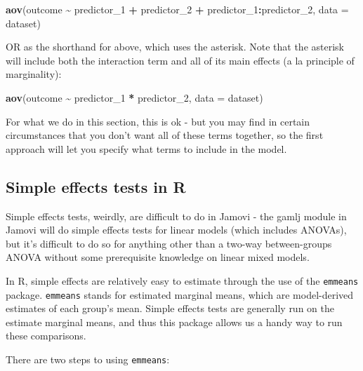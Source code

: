 \documentclass[
]{book}
\newenvironment{Shaded}{\begin{snugshade}}{\end{snugshade}}
\newcommand{\AttributeTok}[1]{\textcolor[rgb]{0.13,0.29,0.53}{#1}}
\newcommand{\FunctionTok}[1]{\textcolor[rgb]{0.13,0.29,0.53}{\textbf{#1}}}
\newcommand{\NormalTok}[1]{#1}
\newcommand{\SpecialCharTok}[1]{\textcolor[rgb]{0.81,0.36,0.00}{\textbf{#1}}}
\begin{document}
\begin{Shaded}
\begin{Highlighting}[]
\FunctionTok{aov}\NormalTok{(outcome }\SpecialCharTok{\textasciitilde{}}\NormalTok{ predictor\_1 }\SpecialCharTok{+}\NormalTok{ predictor\_2 }\SpecialCharTok{+}\NormalTok{ predictor\_1}\SpecialCharTok{:}\NormalTok{predictor\_2, }\AttributeTok{data =}\NormalTok{ dataset)}
\end{Highlighting}
\end{Shaded}

OR as the shorthand for above, which uses the asterisk. Note that the asterisk will include both the interaction term and all of its main effects (a la principle of marginality):

\begin{Shaded}
\begin{Highlighting}[]
\FunctionTok{aov}\NormalTok{(outcome }\SpecialCharTok{\textasciitilde{}}\NormalTok{ predictor\_1 }\SpecialCharTok{*}\NormalTok{ predictor\_2, }\AttributeTok{data =}\NormalTok{ dataset)}
\end{Highlighting}
\end{Shaded}

For what we do in this section, this is ok - but you may find in certain circumstances that you don't want all of these terms together, so the first approach will let you specify what terms to include in the model.

\hypertarget{simple-effects-tests-in-r}{%
\subsection{Simple effects tests in R}\label{simple-effects-tests-in-r}}

Simple effects tests, weirdly, are difficult to do in Jamovi - the gamlj module in Jamovi will do simple effects tests for linear models (which includes ANOVAs), but it's difficult to do so for anything other than a two-way between-groups ANOVA without some prerequisite knowledge on linear mixed models.

In R, simple effects are relatively easy to estimate through the use of the \texttt{emmeans} package. \texttt{emmeans} stands for estimated marginal means, which are model-derived estimates of each group's mean. Simple effects tests are generally run on the estimate marginal means, and thus this package allows us a handy way to run these comparisons.

There are two steps to using \texttt{emmeans}:
\end{document}
